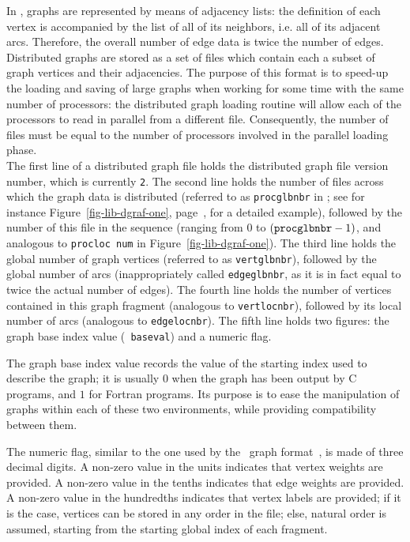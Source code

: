 In \scotch, graphs are represented by means of adjacency lists: the
definition of each vertex is accompanied by the list of all of its
neighbors, i.e.  all of its adjacent arcs. Therefore, the overall
number of edge data is twice the number of edges. Distributed graphs
are stored as a set of files which contain each a subset of graph vertices
and their adjacencies. The purpose of this format is to speed-up the
loading and saving of large graphs when working for some time with the
same number of processors: the distributed graph loading routine will
allow each of the processors to read in parallel from a different file.
Consequently, the number of files must be equal to the number of
processors involved in the parallel loading phase.
\\

The first line of a distributed graph file holds the distributed graph
file version number, which is currently {\tt 2}. The second line holds
the number of files across which the graph data is distributed
(referred to as {\tt proc\lbo glb\lbo nbr} in \libscotch; see for
instance Figure~\ref{fig-lib-dgraf-one},
page~\pageref{fig-lib-dgraf-one}, for a detailed example), followed by
the number of this file in the sequence (ranging from $0$ to $({\tt
proc\lbo glb\lbo nbr} - 1)$, and analogous to {\tt proc\lbo loc\lbo
num} in Figure~\ref{fig-lib-dgraf-one}).
The third line holds the global number of graph vertices
(referred to as {\tt vert\lbo glb\lbo nbr}), followed by the global
number of arcs (inappropriately called {\tt edge\lbo glb\lbo nbr}, as
it is in fact equal to twice the actual number of edges).
The fourth line holds the number of vertices contained in
this graph fragment (analogous to {\tt vert\lbo loc\lbo nbr}),
followed by its local number of arcs (analogous to
{\tt edge\lbo loc\lbo nbr}).
The fifth line holds two figures: the graph base index value ({\tt
baseval}) and a numeric flag.

The graph base index value records the value of the starting index
used to describe the graph; it is usually $0$ when the graph has been
output by C programs, and $1$ for Fortran programs. Its purpose is to
ease the manipulation of graphs within each of these two environments,
while providing compatibility between them.

The numeric flag, similar to the one used by the \chaco\ graph
format~\cite{hele93c}, is made of three decimal digits.
A non-zero value in the units indicates that vertex weights are provided.
A non-zero value in the tenths indicates that edge weights are provided.
A non-zero value in the hundredths indicates that vertex labels are provided;
if it is the case, vertices can be stored in any order in the file; else,
natural order is assumed, starting from the starting global index of
each fragment.


